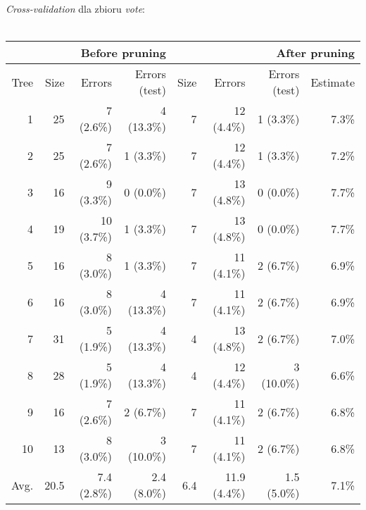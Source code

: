 \documentclass{article}
\begin{document}
\begin{itemize}
\emph{Cross-validation} dla zbioru \emph{vote}:\\\\
\begin{tabular}{|r||r|r|r||r|r|r|r|}
\hline
&\multicolumn{3}{1||}{Before pruning}&\multicolumn{4}{1|}{After pruning} \\
\hline
Tree  & Size & Errors       & Errors (test) & Size & Errors       & Errors (test) & Estimate \\
\hline\hline
    1 &   25 &    7 (2.6\%) &    4 (13.3\%) &    7 &   12 (4.4\%) &    1 (3.3\%)  &   7.3\%  \\
    2 &   25 &    7 (2.6\%) &    1 (3.3\%)  &    7 &   12 (4.4\%) &    1 (3.3\%)  &   7.2\%  \\
    3 &   16 &    9 (3.3\%) &    0 (0.0\%)  &    7 &   13 (4.8\%) &    0 (0.0\%)  &   7.7\%  \\
    4 &   19 &   10 (3.7\%) &    1 (3.3\%)  &    7 &   13 (4.8\%) &    0 (0.0\%)  &   7.7\%  \\
    5 &   16 &    8 (3.0\%) &    1 (3.3\%)  &    7 &   11 (4.1\%) &    2 (6.7\%)  &   6.9\%  \\
    6 &   16 &    8 (3.0\%) &    4 (13.3\%) &    7 &   11 (4.1\%) &    2 (6.7\%)  &   6.9\%  \\
    7 &   31 &    5 (1.9\%) &    4 (13.3\%) &    4 &   13 (4.8\%) &    2 (6.7\%)  &   7.0\%  \\
    8 &   28 &    5 (1.9\%) &    4 (13.3\%) &    4 &   12 (4.4\%) &    3 (10.0\%) &   6.6\%  \\
    9 &   16 &    7 (2.6\%) &    2 (6.7\%)  &    7 &   11 (4.1\%) &    2 (6.7\%)  &   6.8\%  \\
   10 &   13 &    8 (3.0\%) &    3 (10.0\%) &    7 &   11 (4.1\%) &    2 (6.7\%)  &   6.8\%  \\
\hline\hline
 Avg. & 20.5 &  7.4 (2.8\%) &  2.4 (8.0\%)  &  6.4 & 11.9 (4.4\%) &  1.5 (5.0\%)  &   7.1\%  \\
\hline
\end{tabular}


\end{itemize}
\end{document}
